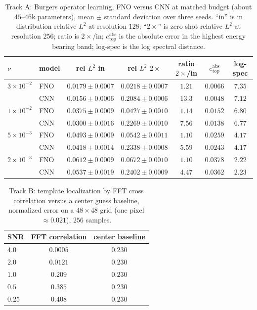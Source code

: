 \documentclass[conference]{IEEEtran}
\begin{document}
\begin{table}[!tb]
\caption{Track A: Burgers operator learning, FNO versus CNN at matched budget (about $45$--$46$k parameters), mean $\pm$ standard deviation over three seeds. ``in'' is in distribution relative $L^2$ at resolution $128$; ``$2\times$'' is zero shot relative $L^2$ at resolution $256$; ratio is $2\times$/in; $e^{\mathrm{abs}}_{\mathrm{top}}$ is the absolute error in the highest energy bearing band; log-spec is the log spectral distance.}
\label{tab:tracka}
\centering
\begin{tabular}{llccccc}
\toprule
$\nu$ & model & rel $L^2$ in & rel $L^2$ $2\times$ & ratio $2\times$/in & $e^{\mathrm{abs}}_{\mathrm{top}}$ & log-spec \\
\midrule
$3\times10^{-2}$ & FNO & $0.0179 \pm 0.0007$ & $0.0218 \pm 0.0007$ & $1.21$ & $0.0066$ & $7.35$ \\
                 & CNN & $0.0156 \pm 0.0006$ & $0.2084 \pm 0.0006$ & $13.3$ & $0.0048$ & $7.12$ \\
\midrule
$1\times10^{-2}$ & FNO & $0.0375 \pm 0.0009$ & $0.0427 \pm 0.0010$ & $1.14$ & $0.0152$ & $6.80$ \\
                 & CNN & $0.0300 \pm 0.0016$ & $0.2269 \pm 0.0010$ & $7.56$ & $0.0138$ & $6.77$ \\
\midrule
$5\times10^{-3}$ & FNO & $0.0493 \pm 0.0009$ & $0.0542 \pm 0.0011$ & $1.10$ & $0.0259$ & $4.17$ \\
                 & CNN & $0.0418 \pm 0.0014$ & $0.2338 \pm 0.0008$ & $5.59$ & $0.0243$ & $4.17$ \\
\midrule
$2\times10^{-3}$ & FNO & $0.0612 \pm 0.0009$ & $0.0672 \pm 0.0010$ & $1.10$ & $0.0378$ & $2.22$ \\
                 & CNN & $0.0537 \pm 0.0019$ & $0.2402 \pm 0.0009$ & $4.47$ & $0.0362$ & $2.23$ \\
\bottomrule
\end{tabular}
\end{table}

\begin{table}[!htbp]
\caption{Track B: template localization by FFT cross correlation versus a center guess baseline, normalized error on a $48\times48$ grid (one pixel $\approx 0.021$), $256$ samples.}
\label{tab:trackb}
\centering
\begin{tabular}{lcc}
\toprule
SNR & FFT correlation & center baseline \\
\midrule
$4.0$  & $0.0005$ & $0.230$ \\
$2.0$  & $0.0121$ & $0.230$ \\
$1.0$  & $0.209$  & $0.230$ \\
$0.5$  & $0.385$  & $0.230$ \\
$0.25$ & $0.408$  & $0.230$ \\
\bottomrule
\end{tabular}
\end{table}
\end{document}
